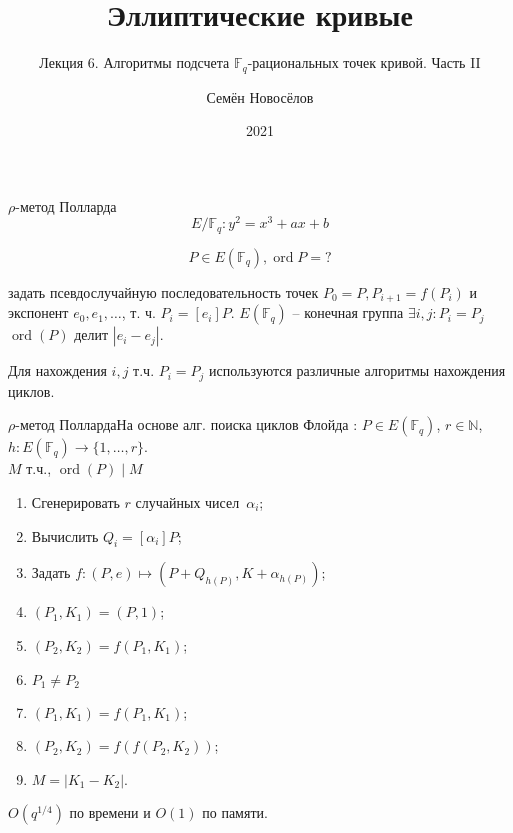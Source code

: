 \documentclass{beamer}
\title{Эллиптические кривые}
\subtitle{Лекция 6. Алгоритмы подсчета $\mathbb{F}_q$-рациональных точек кривой. Часть II}
\author{Семён Новосёлов}
\institute{БФУ им. И. Канта}
\date{2021}
\begin{document}
\frame{\titlepage}

\begin{frame}{$\rho$-метод Полларда}
\[E/\mathbb{F}_q: y^2 = x^3 + a x + b\]

\[P \in E(\mathbb{F}_q), \operatorname{ord}{P} = ?\]

 задать псевдослучайную последовательность точек $P_0 = P, P_{i+1} = f(P_{i})$ и экспонент $e_0, e_1, \ldots$, т. ч. $P_i = [e_i] P$. $E(\mathbb{F}_q)$ -- конечная группа \MyImplies $\exists i, j: P_i = P_j$ \MyImplies $\operatorname{ord}(P)$ делит $|e_i - e_j|$.

\vspace{1em}
Для нахождения $i,j$ т.ч. $P_i = P_j$ используются различные алгоритмы нахождения циклов.
\end{frame}

\begin{frame}{$\rho$-метод Полларда}{На основе алг. поиска циклов Флойда}
: $P \in E(\mathbb{F}_q)$, $r \in \mathbb{N}$, $h: E(\mathbb{F}_q) \rightarrow \{1, \ldots, r\}$. \\
 $M$ т.ч., $\operatorname{ord}(P) \mid M$\\
\begin{enumerate}
    \item Сгенерировать $r$ случайных чисел~$\alpha_i$;
    \item Вычислить $Q_i = [\alpha_i] P$;
    \item Задать $f: (P, e) \mapsto (P + Q_{h(P)}, K+\alpha_{h(P)})$;
    \item $(P_1, K_1) = (P, 1)$;
    \item $(P_2, K_2) = f(P_1, K_1)$;
    \item {} $P_1 \neq P_2$ 
    \item \quad $(P_1, K_1) = f(P_1, K_1)$;
    \item \quad $(P_2, K_2) = f(f(P_2, K_2))$;
    \item {} $M = |K_1 - K_2|$.
\end{enumerate}

 $O({q^{1/4}})$ по времени и $O(1)$ по памяти. 
\end{frame}

%    
\end{document}
